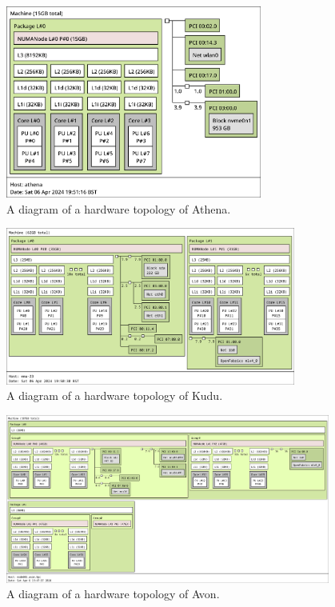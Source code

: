 \begin{figure}[H]
    \centering
    \includegraphics[width=0.75\textwidth]{images/8_appendix/athena-topology.png}
    \caption{A diagram of a hardware topology of Athena.}
    \label{fig:athena-topology}
\end{figure}

\begin{figure}[H]
    \centering
    \includegraphics[width=0.85\textwidth]{images/8_appendix/kudu-topology.png}
    \caption{A diagram of a hardware topology of Kudu.}
    \label{fig:kudu-topology}
\end{figure}

\begin{figure}[H]
    \centering
    \includegraphics[width=0.95\textwidth]{images/8_appendix/avon-topology.png}
    \caption{A diagram of a hardware topology of Avon.}
    \label{fig:avon-topology}
\end{figure}

